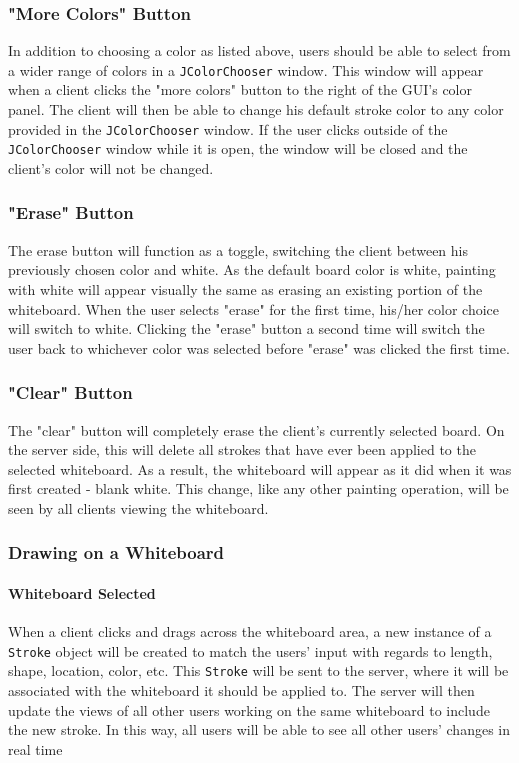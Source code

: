 \subsubsection{"More Colors" Button}
In addition to choosing a color as listed above, users should be able to select from a wider range of colors in a \texttt{JColorChooser} window. This window will appear when a client clicks the "more colors" button to the right of the GUI's color panel. The client will then be able to change his default stroke color to any color provided in the \texttt{JColorChooser} window. If the user clicks outside of the \texttt{JColorChooser} window while it is open, the window will be closed and the client's color will not be changed.

\subsubsection{"Erase" Button}
The erase button will function as a toggle, switching the client between his previously chosen color and white. As the default board color is white, painting with white will appear visually the same as erasing an existing portion of the whiteboard. When the user selects "erase" for the first time, his/her color choice will switch to white.  Clicking the "erase" button a second time will switch the user back to whichever color was selected before "erase" was clicked the first time.

\subsubsection{"Clear" Button}
The "clear" button will completely erase the client's currently selected board.  On the server side, this will delete all strokes that have ever been applied to the selected whiteboard. As a result, the whiteboard will appear as it did when it was first created - blank white. This change, like any other painting operation, will be seen by all clients viewing the whiteboard.

\subsubsection{Drawing on a Whiteboard}

\paragraph{Whiteboard Selected}
When a client clicks and drags across the whiteboard area, a new instance of a \texttt{Stroke} object will be created to match the users' input with regards to length, shape, location, color, etc.  This \texttt{Stroke} will be sent to the server, where it will be associated with the whiteboard it should be applied to. The server will then update the views of all other users working on the same whiteboard to include the new stroke.  In this way, all users will be able to see all other users' changes in real time

